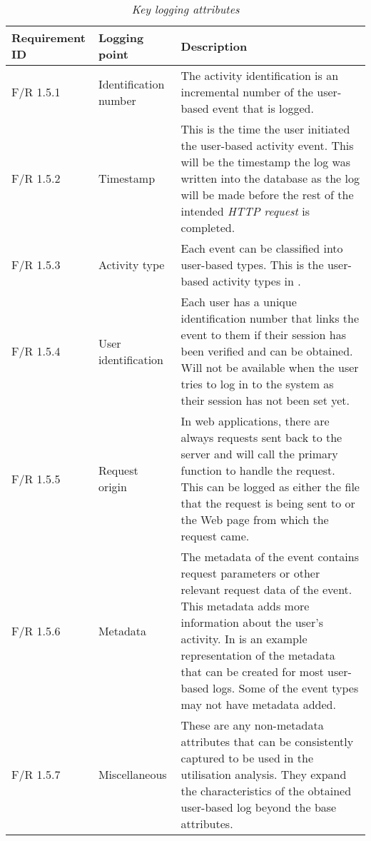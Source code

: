 \begin{table}[!htb]
	\centering
	\caption[Key logging attributes]
	{\textit{Key logging attributes}}
	\label{tbl:ch2_keyLoggingAttributes}
	\begin{tabularx}{\textwidth}{|l|l|X|}
		\hline \textbf{Requirement ID} & \textbf{Logging point} & \textbf{Description} \\
		\hline F/R 1.5.1 & Identification number & The activity identification is an incremental number of the user-based event that is logged.\\
		\hline F/R 1.5.2 & Timestamp & This is the time the user initiated the user-based activity event. This will be the timestamp the log was written into the database as the log will be made before the rest of the intended \textit{HTTP request} is completed. \\
		\hline F/R 1.5.3 & Activity type & Each event can be classified into user-based types. This is the user-based activity types in \Cref{tbl:ch2_userActivityTypes}.\\
		\hline F/R 1.5.4 & User identification & Each user has a unique identification number that links the event to them if their session has been verified and can be obtained. Will not be available when the user tries to log in to the system as their session has not been set yet. \\
		\hline F/R 1.5.5 & Request origin & In web applications, there are always requests sent back to the server and will call the primary function to handle the request. This can be logged as either the file that the request is being sent to or the Web page from which the request came. \\
		\hline F/R 1.5.6 & Metadata & The metadata of the event contains request parameters or other relevant request data of the event. This metadata adds more information about the user's activity.
		In \Cref{fig:Ch2_Metadata_Json_Example} is an example representation of the metadata that can be created for most user-based logs. Some of the event types may not have metadata added. \\
		\hline F/R 1.5.7 & Miscellaneous & These are any non-metadata attributes that can be consistently captured to be used in the utilisation analysis. They expand the characteristics of the obtained user-based log beyond the base attributes. \\ \hline
	\end{tabularx}
\end{table}

\clearpage

